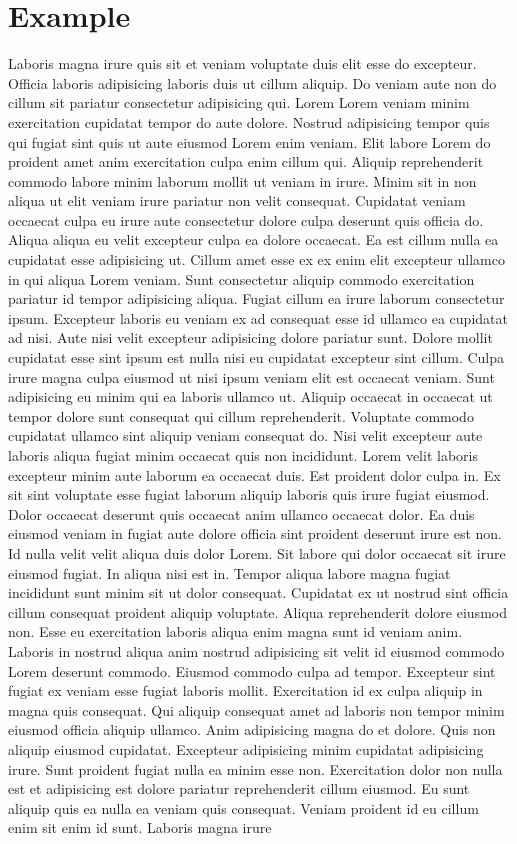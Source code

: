 \chapter{Example}
Laboris magna irure quis sit et veniam voluptate duis elit esse do excepteur. Officia laboris adipisicing laboris duis ut cillum aliquip. Do veniam aute non do cillum sit pariatur consectetur adipisicing qui. Lorem Lorem veniam minim exercitation cupidatat tempor do aute dolore. Nostrud adipisicing tempor quis qui fugiat sint quis ut aute eiusmod Lorem enim veniam. Elit labore Lorem do proident amet anim exercitation culpa enim cillum qui. Aliquip reprehenderit commodo labore minim laborum mollit ut veniam in irure. Minim sit in non aliqua ut elit veniam irure pariatur non velit consequat. Cupidatat veniam occaecat culpa eu irure aute consectetur dolore culpa deserunt quis officia do. Aliqua aliqua eu velit excepteur culpa ea dolore occaecat. Ea est cillum nulla ea cupidatat esse adipisicing ut. Cillum amet esse ex ex enim elit excepteur ullamco in qui aliqua Lorem veniam. Sunt consectetur aliquip commodo exercitation pariatur id tempor adipisicing aliqua. Fugiat cillum ea irure laborum consectetur ipsum. Excepteur laboris eu veniam ex ad consequat esse id ullamco ea cupidatat ad nisi. Aute nisi velit excepteur adipisicing dolore pariatur sunt. Dolore mollit cupidatat esse sint ipsum est nulla nisi eu cupidatat excepteur sint cillum. Culpa irure magna culpa eiusmod ut nisi ipsum veniam elit est occaecat veniam. Sunt adipisicing eu minim qui ea laboris ullamco ut. Aliquip occaecat in occaecat ut tempor dolore sunt consequat qui cillum reprehenderit. Voluptate commodo cupidatat ullamco sint aliquip veniam consequat do. Nisi velit excepteur aute laboris aliqua fugiat minim occaecat quis non incididunt. Lorem velit laboris excepteur minim aute laborum ea occaecat duis. Est proident dolor culpa in. Ex sit sint voluptate esse fugiat laborum aliquip laboris quis irure fugiat eiusmod. Dolor occaecat deserunt quis occaecat anim ullamco occaecat dolor. Ea duis eiusmod veniam in fugiat aute dolore officia sint proident deserunt irure est non. Id nulla velit velit aliqua duis dolor Lorem. Sit labore qui dolor occaecat sit irure eiusmod fugiat. In aliqua nisi est in. Tempor aliqua labore magna fugiat incididunt sunt minim sit ut dolor consequat. Cupidatat ex ut nostrud sint officia cillum consequat proident aliquip voluptate. Aliqua reprehenderit dolore eiusmod non. Esse eu exercitation laboris aliqua enim magna sunt id veniam anim. Laboris in nostrud aliqua anim nostrud adipisicing sit velit id eiusmod commodo Lorem deserunt commodo. Eiusmod commodo culpa ad tempor. Excepteur sint fugiat ex veniam esse fugiat laboris mollit. Exercitation id ex culpa aliquip in magna quis consequat. Qui aliquip consequat amet ad laboris non tempor minim eiusmod officia aliquip ullamco. Anim adipisicing magna do et dolore. Quis non aliquip eiusmod cupidatat. Excepteur adipisicing minim cupidatat adipisicing irure. Sunt proident fugiat nulla ea minim esse non. Exercitation dolor non nulla est et adipisicing est dolore pariatur reprehenderit cillum eiusmod. Eu sunt aliquip quis ea nulla ea veniam quis consequat. Veniam proident id eu cillum enim sit enim id sunt. Laboris magna irure 